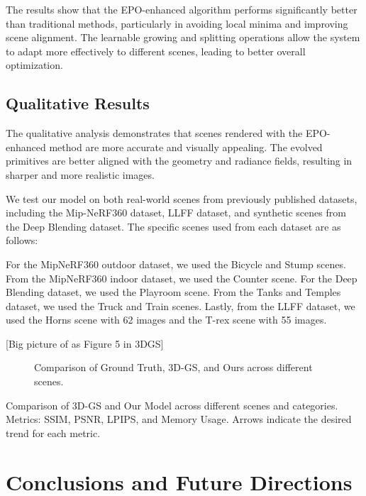 \documentclass[11pt]{report}
\begin{document}
The results show that the EPO-enhanced algorithm performs significantly better than traditional methods, particularly in avoiding local minima and improving scene alignment. The learnable growing and splitting operations allow the system to adapt more effectively to different scenes, leading to better overall optimization.


\section{Qualitative Results}

The qualitative analysis demonstrates that scenes rendered with the EPO-enhanced method are more accurate and visually appealing. The evolved primitives are better aligned with the geometry and radiance fields, resulting in sharper and more realistic images.

We test our model on both real-world scenes from previously published datasets, including the Mip-NeRF360 dataset, LLFF dataset, and synthetic scenes from the Deep Blending dataset. The specific scenes used from each dataset are as follows: 

For the MipNeRF360 outdoor dataset, we used the Bicycle and Stump scenes. From the MipNeRF360 indoor dataset, we used the Counter scene. For the Deep Blending dataset, we used the Playroom scene. From the Tanks and Temples dataset, we used the Truck and Train scenes. Lastly, from the LLFF dataset, we used the Horns scene with 62 images and the T-rex scene with 55 images.

[Big picture of as Figure 5 in 3DGS]

\begin{figure}[H]
    \centering
    
    \caption{Comparison of Ground Truth, 3D-GS, and Ours across different scenes.}
    \label{fig:comparison}
\end{figure}

\begin{table}[h!]
    \centering
    
    \caption{Comparison of 3D-GS and Our Model across different scenes and categories. Metrics: SSIM, PSNR, LPIPS, and Memory Usage. Arrows indicate the desired trend for each metric.}
    \label{tab:comparison}
    \end{table}

\chapter{Conclusions and Future Directions}
\end{document}
